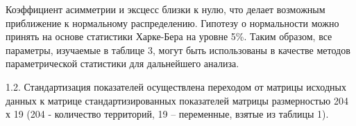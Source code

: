 
Коэффициент асимметрии и эксцесс близки к нулю, что делает возможным
приближение к нормальному распределению. Гипотезу о нормальности можно
принять на основе статистики Харке-Бера на уровне 5\%. Таким образом,
все параметры, изучаемые в таблице 3, могут быть использованы в качестве
методов параметрической статистики для дальнейшего анализа.

1.2. Стандартизация показателей осуществлена переходом от матрицы
исходных данных к матрице стандартизированных показателей матрицы
размерностью 204 х 19 (204 - количество территорий, 19 -- переменные,
взятые из таблицы 1).

